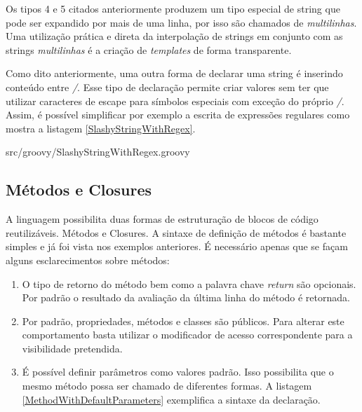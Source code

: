 \documentclass[12pt]{article}
\begin{document}
    Os tipos 4 e 5 citados anteriormente produzem um tipo especial de string que
    pode ser expandido por mais de uma linha, por isso são chamados de \emph{multilinhas}.
    Uma utilização prática e direta da interpolação de strings em conjunto com as
    strings \emph{multili\-nhas} é a criação de \emph{templates} de forma transparente. 
    
    Como dito anteriormente, uma outra forma de declarar uma string é inserindo
    conteúdo entre \emph{/}. Esse tipo de declaração permite criar valores sem 
    ter que utilizar ca\-racteres de escape para símbolos especiais com exceção 
    do próprio \emph{/}. Assim, é possível simplificar por exemplo a escrita de 
    expressões regulares como mostra a listagem \ref{SlashyStringWithRegex}.
    
    
                    {src/groovy/SlashyStringWithRegex.groovy}

\subsection{Métodos e Closures}

    A linguagem possibilita duas formas de estruturação de blocos de código 
    reutilizáveis. Métodos e Closures. A sintaxe de definição de métodos
    é bastante simples e já foi vista nos exemplos anteriores. É necessário apenas
    que se façam alguns esclarecimentos sobre métodos:

    \begin{enumerate}
        \item O tipo de retorno do método bem como a palavra chave \emph{return}
              são opcionais. Por padrão o resultado da avaliação da última linha
              do método é retornada.
        \item Por padrão, propriedades, métodos e classes são públicos. Para alterar
              este comportamento basta utilizar o modificador de acesso correspondente
              para a visibilidade pretendida.
        \item É possível definir parâmetros como valores padrão. Isso possibilita
              que o mesmo método possa ser chamado de diferentes formas. A listagem
              \ref{MethodWithDefaultParameters} exemplifica a sintaxe da declaração.
    \end{enumerate}
    
\end{document}

